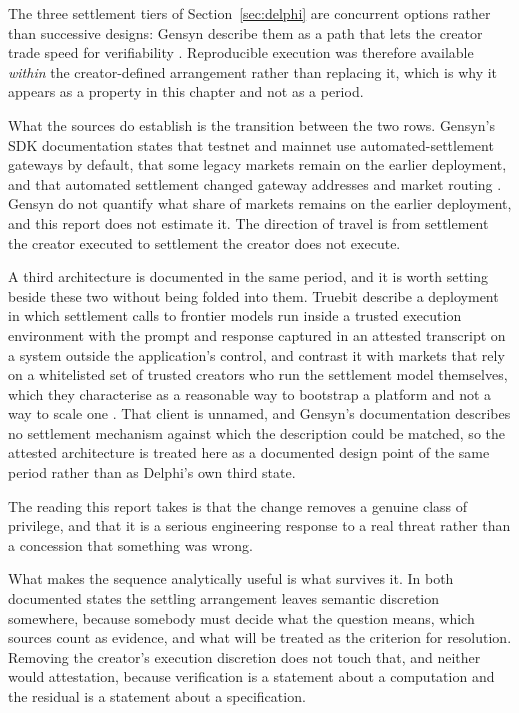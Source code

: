 The three settlement tiers of Section~\ref{sec:delphi} are concurrent options rather than
successive designs: Gensyn describe them as a path that lets the creator trade speed for
verifiability \cite{gensyn2026delphi}. Reproducible execution was therefore available
\emph{within} the creator-defined arrangement rather than replacing it, which is why it
appears as a property in this chapter and not as a period.

What the sources do establish is the transition between the two rows. Gensyn's SDK
documentation states that testnet and mainnet use automated-settlement gateways by default,
that some legacy markets remain on the earlier deployment, and that automated settlement
changed gateway addresses and market routing \cite{gensyn2026sdk}. Gensyn do not quantify
what share of markets remains on the earlier deployment, and this report does not estimate
it. The direction of travel is from settlement the creator executed to settlement the
creator does not execute.

A third architecture is documented in the same period, and it is worth setting beside these
two without being folded into them. Truebit describe a deployment in which settlement calls
to frontier models run inside a trusted execution environment with the prompt and response
captured in an attested transcript on a system outside the application's control, and
contrast it with markets that rely on a whitelisted set of trusted creators
who run the settlement model themselves, which they characterise as a reasonable way to
bootstrap a platform and not a way to scale one \cite{truebit2026orchestration}. That
client is unnamed, and Gensyn's documentation describes no settlement mechanism against
which the description could be matched, so the attested architecture is treated here as a
documented design point of the same period rather than as Delphi's own third state.

The reading this report takes is that the change removes a genuine class of privilege, and
that it is a serious engineering response to a real threat rather than a concession that
something was wrong.

What makes the sequence analytically useful is what survives it. In both documented states
the settling arrangement leaves semantic discretion somewhere, because somebody must decide
what the question means, which sources count as evidence, and what will be treated as the
criterion for resolution. Removing the creator's execution discretion does not touch that,
and neither would attestation, because verification is a statement about a computation and
the residual is a statement about a specification.

